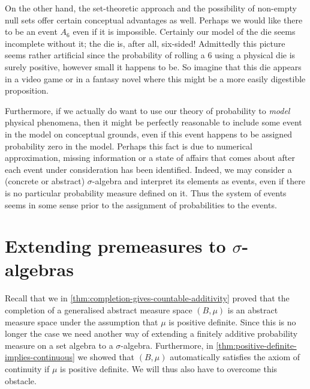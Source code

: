 \documentclass[article, a4paper, 11pt, oneside]{memoir}
\numberwithin{equation}{chapter}
\begin{document}
On the other hand, the set-theoretic approach and the possibility of non-empty null sets offer certain conceptual advantages as well. Perhaps we would like there to be an event $A_6$ even if it is impossible. Certainly our model of the die seems incomplete without it; the die is, after all, six-sided! Admittedly this picture seems rather artificial since the probability of rolling a $6$ using a physical die is surely positive, however small it happens to be. So imagine that this die appears in a video game or in a fantasy novel where this might be a more easily digestible proposition.

Furthermore, if we actually do want to use our theory of probability to \emph{model} physical phenomena, then it might be perfectly reasonable to include some event in the model on conceptual grounds, even if this event happens to be assigned probability zero in the model. Perhaps this fact is due to numerical approximation, missing information or a state of affairs that comes about after each event under consideration has been identified. Indeed, we may consider a (concrete or abstract) $\sigma$-algebra and interpret its elements as events, even if there is no particular probability measure defined on it. Thus the system of events seems in some sense prior to the assignment of probabilities to the events.


\section[Extending premeasures to sigma-algebras][Extending premeasures to $\sigma$-algebras]{Extending premeasures to $\sigma$-algebras}

Recall that we in \cref{thm:completion-gives-countable-additivity} proved that the completion of a generalised abstract measure space $(B,\mu)$ is an abstract measure space under the assumption that $\mu$ is positive definite. Since this is no longer the case we need another way of extending a finitely additive probability measure on a set algebra to a $\sigma$-algebra. Furthermore, in \cref{thm:positive-definite-implies-continuous} we showed that $(B,\mu)$ automatically satisfies the axiom of continuity if $\mu$ is positive definite. We will thus also have to overcome this obstacle.

\end{document}
